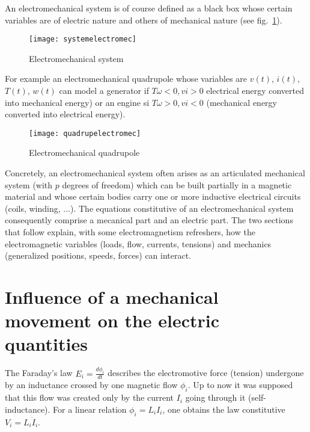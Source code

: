 An electromechanical system is of course defined as a black box whose certain variables are of electric nature and others of mechanical nature (see fig.~\ref{fig:systemelectromec}). 

\begin{figure}[t]
\begin{center}
\texttt{[image: systemelectromec]}
\caption{Electromechanical system}
\label{fig:systemelectromec}
\end{center}
\end{figure}
For example an electromechanical quadrupole whose variables are $v(t)$, $i(t)$, $T(t)$, $w(t)$ can model a generator if $T\omega<0, vi>0$ electrical energy converted into mechanical energy) or an engine si $T\omega>0, vi<0$ (mechanical energy converted into electrical energy).


\begin{figure}[t]
\begin{center}
\texttt{[image: quadrupelectromec]}
\caption{Electromechanical quadrupole}
\label{fig:quadrupelectromec}
\end{center}
\end{figure}

Concretely, an electromechanical system often arises as an articulated mechanical system (with $p$ degrees of freedom) which can be built partially in a magnetic material and whose certain bodies carry one or more inductive electrical circuits (coils, winding, ...). The equations constitutive of an electromechanical system consequently comprise a mecanical part and an electric part. The two sections that follow explain, with some electromagnetism refreshers, how the electromagnetic variables (loads, flow, currents, tensions) and mechanics (generalized positions, speeds, forces) can interact.

\section{Influence of a mechanical movement on the electric quantities} 

The Faraday’s law $E_i=\frac{d\phi_i}{dt}$ describes the electromotive force (tension) undergone by an inductance crossed by one magnetic flow $\phi_i$. Up to now it was supposed that this flow was created only by the current $I_i$ going through it (self-inductance). For a linear relation  $\phi_i=L_iI_i$, one obtains the law constitutive $V_i=L_i \dot{I}_i$.

